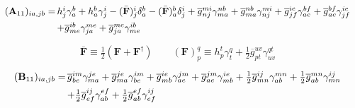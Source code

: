 \begin{subappendices}
    \begin{equation}
        \label{eq:a11-odc12-formula}
        \begin{array}{r@{\,}l}
            (\mathbf{A}_{11})_{ia,jb}
            =
            &
            h_j^i
            \gamma_a^b
            +
            h_a^b
            \gamma_j^i
            -
            (\bar{\mathbf{F}})_j^i
            \delta_a^b
            -
            (\bar{\mathbf{F}})_a^b
            \delta_j^i
            +
            \overline{g}_{nj}^{mi}
            \gamma_{ma}^{nb}
            +
            \overline{g}_{ma}^{nb}
            \gamma_{nj}^{mi}
            +
            \overline{g}_{jf}^{ie}
            \gamma_{ae}^{bf}
            +
            \overline{g}_{ae}^{bf}
            \gamma_{jf}^{ie}
            \\[5pt]
            &
            +
            \overline{g}_{me}^{ib}
            \gamma_{ja}^{me}
            +
            \overline{g}_{ja}^{me}
            \gamma_{me}^{ib}
        \end{array}
    \end{equation}

    \begin{equation}
        \bar{\mathbf{F}}
        \equiv
        \tfrac{1}{2}
        (\mathbf{F} + \mathbf{F}^\dagger)
        \qquad
        (\mathbf{F})_p^q
        \equiv
        h_p^t
        \gamma_t^q
        +
        \tfrac{1}{2}
        \overline{g}_{pt}^{uv}
        \gamma_{uv}^{qt}
    \end{equation}

    \begin{equation}
        \label{eq:b11-odc12-formula}
        \begin{array}{r@{\,}l}
            (\mathbf{B}_{11})_{ia,jb}
            =
            &
            \overline{g}_{be}^{im}
            \gamma_{ma}^{je}
            +
            \overline{g}_{ma}^{je}
            \gamma_{be}^{im}
            +
            \overline{g}_{mb}^{ie}
            \gamma_{ae}^{jm}
            +
            \overline{g}_{ae}^{jm}
            \gamma_{mb}^{ie}
            +
            \tfrac{1}{2}
            \overline{g}_{mn}^{ij}
            \gamma_{ab}^{mn}
            +
            \tfrac{1}{2}
            \overline{g}_{ab}^{mn}
            \gamma_{mn}^{ij}
            \\[5pt]
            &
            +
            \tfrac{1}{2}
            \overline{g}_{ef}^{ij}
            \gamma_{ab}^{ef}
            +
            \tfrac{1}{2}
            \overline{g}_{ab}^{ef}
            \gamma_{ef}^{ij}
        \end{array}
    \end{equation}


\end{subappendices}
